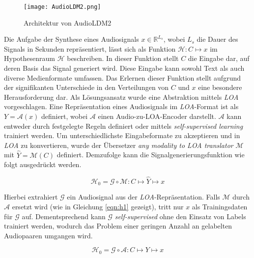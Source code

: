 \documentclass[
  a4paper,  %
  twoside,  %
  bibliography=totoc,
  headsepline,
  cleardoublepage=empty,
  parskip=half,
  draft=false
]{scrbook}
\begin{document}
\begin{figure}[h]
  \centering
  \texttt{[image: AudioLDM2.png]}
  \caption[AudioLDM2 Architektur]{Architektur von AudioLDM2\cite{liu_audioldm2_2023}}
  \label{fig:AudioLDM2}
\end{figure} 

Die Aufgabe der Synthese eines Audiosignals $x \in \mathbb{R}^{L_s}$, wobei $L_s$ die Dauer des Signals in Sekunden repräsentiert, lässt sich als Funktion $\mathcal{H}: C \mapsto x$ im Hypothesenraum $\mathcal{H}$ beschreiben. In dieser Funktion stellt $C$ die Eingabe dar, auf deren Basis das Signal generiert wird. Diese Eingabe kann sowohl Text als auch diverse Medienformate umfassen. Das Erlernen dieser Funktion stellt aufgrund der signifikanten Unterschiede in den Verteilungen von $C$ und $x$ eine besondere Herausforderung dar. Als Lösungsansatz wurde eine Abstraktion mittels \emph{LOA} vorgeschlagen. Eine Repräsentation eines Audiosignals im \emph{LOA}-Format ist als $Y=\mathcal{A}(x)$ definiert, wobei $\mathcal{A}$ einen Audio-zu-LOA-Encoder darstellt. $\mathcal{A}$ kann entweder durch festgelegte Regeln definiert oder mittels \emph{self-supervised learning} \cite{tan_regeneration_2023} trainiert werden. Um unterschiedlichste Eingabeformate zu akzeptieren und in \emph{LOA} zu konvertieren, wurde der Übersetzer \emph{any modality to LOA translator} $\mathcal{M}$ mit $\hat{Y}=\mathcal{M}(C)$ definiert. Demzufolge kann die Signalgenerierungsfunktion wie folgt ausgedrückt werden. \cite{liu_audioldm2_2023}

\begin{equation}
    \mathcal{H}_0=\mathcal{G} \circ \mathcal{M}: C \mapsto \hat{Y} \mapsto x
\end{equation}

Hierbei extrahiert $\mathcal{G}$ ein Audiosignal aus der \emph{LOA}-Repräsentation. Falls $\mathcal{M}$ durch $\mathcal{A}$ ersetzt wird  (wie in Gleichung \ref{eqn:h1} gezeigt), tritt nur $x$ als Trainingsdaten für $\mathcal{G}$ auf. Dementsprechend kann $\mathcal{G}$ \emph{self-supervised} ohne den Einsatz von Labels trainiert werden, wodurch das Problem einer geringen Anzahl an gelabelten Audiopaaren umgangen wird. \cite{liu_audioldm2_2023}

\begin{equation}
\label{eqn:h1}
    \mathcal{H}_0=\mathcal{G} \circ \mathcal{A}: C \mapsto Y \mapsto x
\end{equation}
\end{document}
